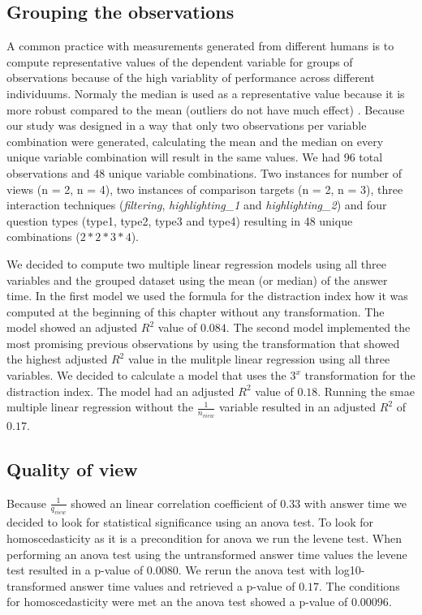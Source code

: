 \subsection{Grouping the observations}
A common practice with measurements generated from different humans is to compute representative values of the dependent variable for groups of
observations because of the high variablity of performance across different individuums. Normaly the median is used as a representative value because
it is more robust compared to the mean (outliers do not have much effect) \citep*{Daszykowski.2007}. Because our study was designed in a way that
only two observations per variable combination were generated, calculating the mean and the median
on every unique variable combination will result in the same values. We had 96 total observations and 48 unique variable combinations. Two instances
for number of views (n = 2, n = 4), two instances of comparison targets (n = 2, n = 3), three interaction techniques (\textit{filtering},
\textit{highlighting\_1} and \textit{highlighting\_2}) and four question types (type1, type2, type3 and type4) resulting in 48 unique combinations
($2 * 2 * 3 * 4$).

We decided to compute two multiple linear regression models using all three variables and the grouped dataset using the mean (or median) of the answer
time. In the first model we used the formula for the distraction index how it was computed at the beginning of this chapter without any transformation.
The model showed an adjusted $R^2$ value of $0.084$. The second model implemented the most promising previous observations by using the transformation
that showed the highest adjusted $R^2$ value in the mulitple linear regression using all three variables. We decided to calculate a model that uses the
$3^x$ transformation for the distraction index. The model had an adjusted $R^2$ value of $0.18$. Running the smae multiple linear regression without the
$\frac{1}{n_{view}}$ variable resulted in an adjusted $R^2$ of $0.17$.

\subsection{Quality of view}
Because $\frac{1}{q_{view}}$ showed an linear correlation coefficient of $0.33$ with answer time we decided to look for statistical significance using
an anova test. To look for homoscedasticity as it is a precondition for anova we run the levene test. When performing an anova test using the untransformed
answer time values the levene test resulted in a p-value of $0.0080$. We rerun the anova test with log10-transformed answer time values and retrieved a p-value
of $0.17$. The conditions for homoscedasticity were met an the anova test showed a p-value of $0.00096$.


